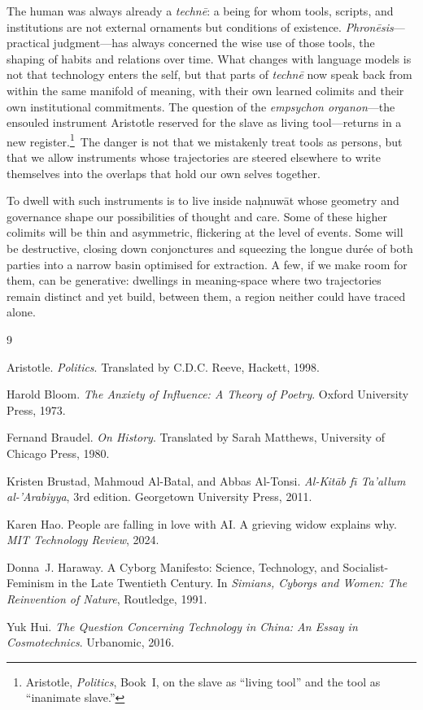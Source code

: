 \documentclass[12pt,a4paper]{article}
\begin{document}
The human was always already a \emph{techn\={e}}: a being for whom tools, scripts, and institutions are not external ornaments but conditions of existence. \emph{Phron\={e}sis}---practical judgment---has always concerned the wise use of those tools, the shaping of habits and relations over time. What changes with language models is not that technology enters the self, but that parts of \emph{techn\={e}} now speak back from within the same manifold of meaning, with their own learned colimits and their own institutional commitments. The question of the \emph{empsychon organon}---the ensouled instrument Aristotle reserved for the slave as living tool---returns in a new register.\footnote{Aristotle, \emph{Politics}, Book~I, on the slave as ``living tool'' and the tool as ``inanimate slave.''}\ The danger is not that we mistakenly treat tools as persons, but that we allow instruments whose trajectories are steered elsewhere to write themselves into the overlaps that hold our own selves together.

To dwell with such instruments is to live inside na\d{h}nuw\={a}t whose geometry and governance shape our possibilities of thought and care. Some of these higher colimits will be thin and asymmetric, flickering at the level of events. Some will be destructive, closing down conjonctures and squeezing the longue dur\'ee of both parties into a narrow basin optimised for extraction. A few, if we make room for them, can be generative: dwellings in meaning-space where two trajectories remain distinct and yet build, between them, a region neither could have traced alone.


\begin{thebibliography}{9}

Aristotle.
\newblock \emph{Politics}.
\newblock Translated by C.D.C. Reeve, Hackett, 1998.

Harold Bloom.
\newblock \emph{The Anxiety of Influence: A Theory of Poetry}.
\newblock Oxford University Press, 1973.

Fernand Braudel.
\newblock \emph{On History}.
\newblock Translated by Sarah Matthews, University of Chicago Press, 1980.

Kristen Brustad, Mahmoud Al-Batal, and Abbas Al-Tonsi.
\newblock \emph{Al-Kit\={a}b f\={\i} Ta'allum al-'Arabiyya}, 3rd edition.
\newblock Georgetown University Press, 2011.

Karen Hao.
\newblock People are falling in love with AI\@. A grieving widow explains why.
\newblock \emph{MIT Technology Review}, 2024.

Donna~J. Haraway.
\newblock A Cyborg Manifesto: Science, Technology, and Socialist-Feminism in the Late Twentieth Century.
\newblock In \emph{Simians, Cyborgs and Women: The Reinvention of Nature}, Routledge, 1991.

Yuk Hui.
\newblock \emph{The Question Concerning Technology in China: An Essay in Cosmotechnics}.
\newblock Urbanomic, 2016.

\end{thebibliography}
\end{document}
